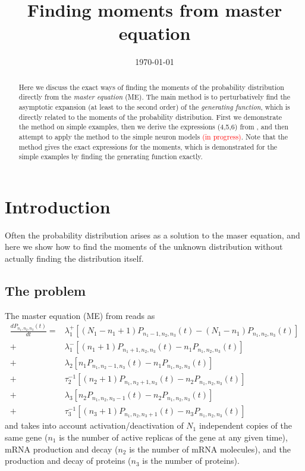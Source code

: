 \documentclass[a4paper, 11pt]{article}
\title{\textbf{Finding moments from master equation}}
\date{\today}
\begin{document}
\maketitle

\begin{abstract}
  Here we discuss the exact ways of finding the moments of the probability distribution directly from the {\it master equation} (ME). The main method is to perturbatively find the asymptotic expansion (at least to the second order) of the {\it generating function}, which is directly related to the moments of the probability distribution. First we demonstrate the method on simple examples, then we derive the expressions (4,5,6) from \cite{PAULSSON2005157}, and then attempt to apply the method to the simple neuron models \textcolor{red}{(in progress)}. Note that the method gives the exact expressions for the moments, which is demonstrated for the simple examples by finding the generating function exactly.
\end{abstract}

\tableofcontents

\section{Introduction}
Often the probability distribution arises as a solution to the maser equation, and here we show how to find the moments of the unknown distribution without actually finding the distribution itself.
\subsection{The problem}

The master equation (ME) from \cite{PAULSSON2005157} reads as
\begin{equation} \label{full_Paulsson_ME}
  \begin{split} 
    \frac{dP_{n_1,n_2,n_3}(t)}{dt} = &\lambda_1^+\left[(N_1-n_1+1)P_{n_1-1,n_2,n_3}(t) - (N_1-n_1)P_{n_1,n_2,n_3}(t)\right]\\
    + & \lambda_1^-\left[(n_1+1)P_{n_1+1,n_2,n_3}(t) - n_1P_{n_1,n_2,n_3}(t)\right] \\
    + & \lambda_2\left[n_1P_{n_1,n_2-1,n_3}(t) - n_1P_{n_1,n_2,n_3}(t)\right]\\
    + & \tau_2^{-1}\left[(n_2+1)P_{n_1,n_2+1,n_3}(t) - n_2P_{n_1,n_2,n_3}(t)\right]\\
    + & \lambda_3\left[n_2P_{n_1,n_2,n_3-1}(t) - n_2P_{n_1,n_2,n_3}(t)\right]\\
    + & \tau_3^{-1}\left[(n_3+1)P_{n_1,n_2,n_3+1}(t) - n_3P_{n_1,n_2,n_3}(t)\right]
  \end{split}
\end{equation}
and takes into account activation/deactivation of $N_1$ independent copies of the same gene ($n_1$ is the number of active replicas of the gene at any given time), mRNA production and decay ($n_2$ is the number of mRNA molecules), and the production and decay of proteins ($n_3$ is the number of proteins).
\end{document}

